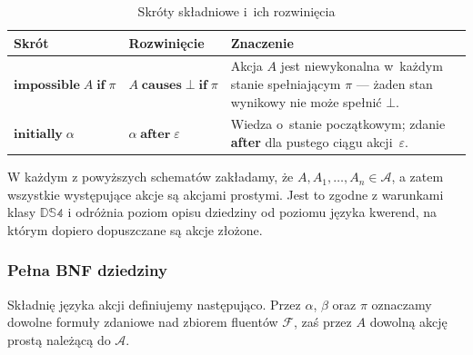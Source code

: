 \documentclass[11pt,a4paper]{article}
\theoremstyle{definition}
\begin{document}
\begin{table}[ht]
\centering
\caption{Skróty składniowe i~ich rozwinięcia}
\label{tab:ds4-action-abbrev}
\renewcommand{\arraystretch}{1.2}
\begin{tabular}{|p{}|p{}|p{}|}
\hline
\textbf{Skrót} & \textbf{Rozwinięcie} & \textbf{Znaczenie} \\ \hline

$\textbf{impossible}\; A \;\textbf{if}\; \pi$ &
$A \;\textbf{causes}\; \bot \;\textbf{if}\; \pi$ &
Akcja $A$ jest niewykonalna w~każdym stanie spełniającym $\pi$ --- żaden stan wynikowy nie może spełnić $\bot$. \\ \hline

$\textbf{initially}\; \alpha$ &
$\alpha \;\textbf{after}\; \varepsilon$ &
Wiedza o~stanie początkowym; zdanie \textbf{after} dla pustego ciągu akcji~$\varepsilon$. \\ \hline

\end{tabular}
\end{table}

W każdym z powyższych schematów zakładamy, że $A,A_1,\dots,A_n \in \mathcal{A}$, a zatem wszystkie występujące akcje są akcjami prostymi. Jest to zgodne z warunkami klasy $\mathbb{DS4}$ i odróżnia poziom opisu dziedziny od poziomu języka kwerend, na którym dopiero dopuszczane są akcje złożone.

\subsubsection{Pełna BNF dziedziny}

Składnię języka akcji definiujemy następująco. Przez $\alpha$, $\beta$ oraz $\pi$ oznaczamy dowolne formuły zdaniowe nad zbiorem fluentów $\mathcal{F}$, zaś przez $A$ dowolną akcję prostą należącą do $\mathcal{A}$.
\end{document}
